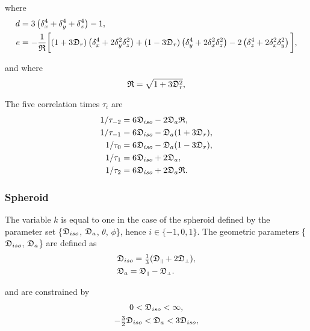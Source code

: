 \noindent where
\begin{align}
 d &= 3 \left( \delta_x^4 + \delta_y^4 + \delta_z^4 \right) - 1, \label{eq: ellipsoid d} \\
 e &= -\frac{1}{\mathfrak{R}} \bigg[ (1 + 3\mathfrak{D}_r) \left(\delta_x^4 + 2\delta_y^2\delta_z^2\right)
   + (1 - 3\mathfrak{D}_r) \left(\delta_y^4 + 2\delta_x^2\delta_z^2\right) - 2 \left(\delta_z^4 + 2\delta_x^2\delta_y^2\right) \bigg], \label{eq: ellipsoid e}
\end{align}

\noindent and where
\begin{equation}
 \mathfrak{R} = \sqrt{1 + 3\mathfrak{D}_r^2},
\end{equation}


The five correlation times $\tau_i$ are
\begin{subequations}
\begin{align}
 1/\tau_{-2} &= 6 \mathfrak{D}_{iso} - 2\mathfrak{D}_a\mathfrak{R},   \label{eq: ellipsoid tau-2} \\
 1/\tau_{-1} &= 6 \mathfrak{D}_{iso} - \mathfrak{D}_a (1 + 3\mathfrak{D}_r), \label{eq: ellipsoid tau-1} \\
 1/\tau_{0}  &= 6 \mathfrak{D}_{iso} - \mathfrak{D}_a (1 - 3\mathfrak{D}_r), \label{eq: ellipsoid tau0} \\
 1/\tau_{1}  &= 6 \mathfrak{D}_{iso} + 2\mathfrak{D}_a,               \label{eq: ellipsoid tau1} \\
 1/\tau_{2}  &= 6 \mathfrak{D}_{iso} + 2\mathfrak{D}_a\mathfrak{R}.   \label{eq: ellipsoid tau2}
\end{align}
\end{subequations}


\subsubsection{Spheroid}
The variable $k$ is equal to one in the case of the spheroid defined by the parameter set \{$\mathfrak{D}_{iso}$, $\mathfrak{D}_a$, $\theta$, $\phi$\}, hence $i \in \{-1, 0, 1\}$.  The geometric parameters \{$\mathfrak{D}_{iso}$, $\mathfrak{D}_a$\} are defined as
\begin{subequations}
\begin{align}
 & \mathfrak{D}_{iso} = \tfrac{1}{3} (\mathfrak{D}_{\scriptscriptstyle \parallel} + 2\mathfrak{D}_{\scriptscriptstyle \perp}),   \label{eq: Diso spheroid def} \\
 & \mathfrak{D}_a = \mathfrak{D}_{\scriptscriptstyle \parallel} - \mathfrak{D}_{\scriptscriptstyle \perp}.                       \label{eq: Da spheroid def}
\end{align}
\end{subequations}

\noindent and are constrained by
\begin{subequations}
\begin{gather}
 0 < \mathfrak{D}_{iso} < \infty, \\
 -\tfrac{3}{2} \mathfrak{D}_{iso} < \mathfrak{D}_a < 3\mathfrak{D}_{iso},
\end{gather}
\end{subequations}

